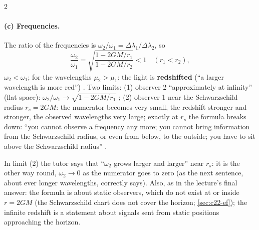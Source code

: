 \begin{paracol}{2}
\paragraph{(c) Frequencies.} The ratio of the frequencies is $\omega_2/\omega_1=\Delta\lambda_1/\Delta\lambda_2$, so
\[
  \frac{\omega_2}{\omega_1}=\sqrt{\frac{1-2GM/r_1}{1-2GM/r_2}}<1\quad(r_1<r_2),
\]
$\omega_2<\omega_1$; for the wavelengths $\mu_2>\mu_1$: the light is \textbf{redshifted} (``a larger wavelength is more red'') . Two limits: (1) observer 2 ``approximately at infinity'' (flat space): $\omega_2/\omega_1\to\sqrt{1-2GM/r_1}$ ; (2) observer 1 near the Schwarzschild radius $r_s=2GM$: the numerator becomes very small, the redshift stronger and stronger, the observed wavelengths very large; exactly at $r_s$ the formula breaks down: ``you cannot observe a frequency any more; you cannot bring information from the Schwarzschild radius, or even from below, to the outside; you have to sit above the Schwarzschild radius'' .
\begin{coursenote}
In limit (2) the tutor says that ``$\omega_2$ grows larger and larger'' near $r_s$: it is the other way round, $\omega_2\to0$ as the numerator goes to zero (as the next sentence, about ever longer wavelengths, correctly says). Also, as in the lecture's final answer: the formula is about static observers, which do not exist at or inside $r=2GM$ (the Schwarzschild chart does not cover the horizon; \cref{sec:c22-ef}); the infinite redshift is a statement about signals sent from static positions approaching the horizon.
\end{coursenote}


\end{paracol}
